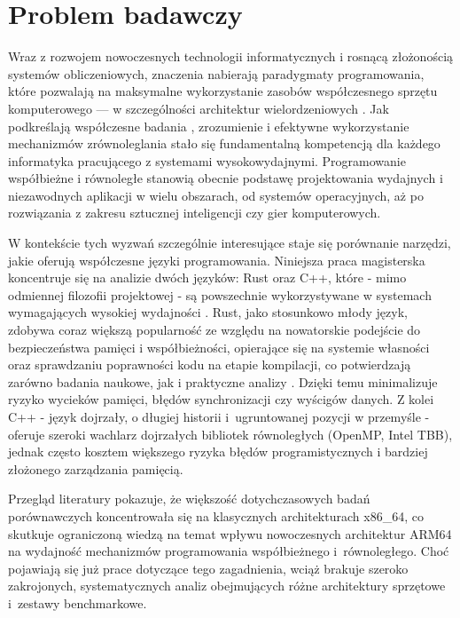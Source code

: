 \section{Problem badawczy}
Wraz z rozwojem nowoczesnych technologii informatycznych i rosnącą złożonością systemów obliczeniowych, znaczenia nabierają paradygmaty programowania, które pozwalają na maksymalne wykorzystanie zasobów współczesnego sprzętu komputerowego — w szczególności architektur wielordzeniowych \cite{10876950,Sesay2024Parallelism}. Jak podkreślają współczesne badania \cite{Adefemi2025Parallelization}, zrozumienie i efektywne wykorzystanie mechanizmów zrównoleglania stało się fundamentalną kompetencją dla każdego informatyka pracującego z systemami wysokowydajnymi. Programowanie współbieżne i równoległe stanowią obecnie podstawę projektowania wydajnych i niezawodnych aplikacji w wielu obszarach, od systemów operacyjnych, aż po rozwiązania z zakresu sztucznej inteligencji czy gier komputerowych.

W kontekście tych wyzwań szczególnie interesujące staje się porównanie narzędzi, jakie oferują współczesne języki programowania. Niniejsza praca magisterska koncentruje się na analizie dwóch języków: Rust oraz C++, które - mimo odmiennej filozofii projektowej - są powszechnie wykorzystywane w systemach wymagających wysokiej wydajności \cite{Hazarika2025RustVsCpp}. Rust, jako stosunkowo młody język, zdobywa coraz większą popularność ze względu na nowatorskie podejście do bezpieczeństwa pamięci i współbieżności, opierające się na systemie własności  oraz sprawdzaniu poprawności kodu na etapie kompilacji, co potwierdzają zarówno badania naukowe, jak i praktyczne analizy \cite{Saligrama2019RustConcurrency,RustFC}. Dzięki temu minimalizuje ryzyko wycieków pamięci, błędów synchronizacji czy wyścigów danych. Z kolei C++ - język dojrzały, o długiej historii i~ugruntowanej pozycji w przemyśle - oferuje szeroki wachlarz dojrzałych bibliotek równoległych (OpenMP, Intel TBB), jednak często kosztem większego ryzyka błędów programistycznych i bardziej złożonego zarządzania pamięcią.

Przegląd literatury pokazuje, że większość dotychczasowych badań porównawczych koncentrowała się na klasycznych architekturach x86\_64, co skutkuje ograniczoną wiedzą na temat wpływu nowoczesnych architektur ARM64 na wydajność mechanizmów programowania współbieżnego i~równoległego. Choć pojawiają się już prace dotyczące tego zagadnienia, wciąż brakuje szeroko zakrojonych, systematycznych analiz obejmujących różne architektury sprzętowe i~zestawy benchmarkowe.

